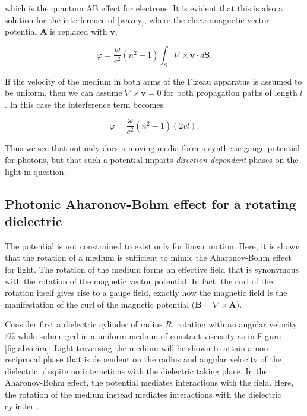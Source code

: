 which is the quantum AB effect for electrons. It is evident that this is also a solution for the interference of \ref{wavey}, where the electromagnetic vector potential $\bm{A}$ is replaced with $\bm{v}$,

\begin{equation}
\varphi = \dfrac{w}{c^2} (n^2-1) \int_{S}^{} \nabla \times \bm{v} \cdot d\bm{S}.
\end{equation}
 
If the velocity of the medium in both arms of the Fizeau apparatus is assumed to be uniform, then we can assume $\nabla \times \bm{v} = 0$ for both propagation paths of length $l$. In this case the interference term becomes

\begin{equation}
\varphi = \dfrac{\omega}{c^2} (n^2-1) (2 v l).
\end{equation}

Thus we see that not only does a moving media form a synthetic gauge potential for photons, but that such a potential imparts \textit{direction dependent} phases on the light in question.

\subsection{Photonic Aharonov-Bohm effect for a rotating dielectric}

The potential is not constrained to exist only for linear motion. Here, it is shown that the rotation of a medium is sufficient to mimic the Aharonov-Bohm effect for light. The rotation of the medium forms an effective field that is synonymous with the rotation of the magnetic vector potential. In fact, the curl of the rotation itself gives rise to a gauge field, exactly how the magnetic field is the manifestation of the curl of the magnetic potential ($\bm{B} = \nabla \times \bm{A}$).

Consider first a dielectric cylinder of radius $R$, rotating with an angular velocity $\Omega \hat{z}$ while submerged in a uniform medium of constant viscosity as in Figure \ref{fig:abvieira}. Light traversing the medium will be shown to attain a non-reciprocal phase that is dependent on the radius and angular velocity of the dielectric, despite no interactions with the dielectric taking place. In the Aharonov-Bohm effect, the potential mediates interactions with the field. Here, the rotation of the medium instead mediates interactions with the dielectric cylinder \cite{Vieira2014a}.


